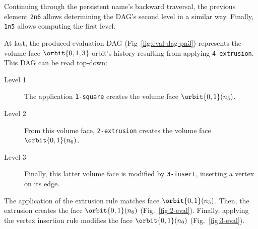 Continuing through the persistent name's backward traversal, the previous element \texttt{2n6} allows determining the DAG's second level %
in a similar way.
Finally, \texttt{1n5} allows computing the first level.   

At last, the produced evaluation DAG (Fig~\ref{fig:eval-dag-pn3}) represents the volume face $\orbit{0,1,3}$-orbit's history  resulting from applying \texttt{4-extrusion}.
This DAG can be read top-down:
\begin{description}
    \item[Level 1] The application \texttt{1-square} creates the volume face $\orbit{0,1}(n_5)$.
    \item[Level 2] From this volume face, \texttt{2-extrusion} creates the vo\-lu\-me face $\orbit{0,1}(n_6)$.
    \item[Level 3] Finally, this latter volume face is modified by \texttt{3-insert}, inserting a vertex on its edge.
\end{description}


The %
application of the extrusion rule
matches face $\orbit{0,1}(n_{5})$. Then, the ex\-tru\-sion creates the face $\orbit{0,1}(n_{6})$ (Fig.~\ref{fig:2-eval}).
Finally, %
applying the vertex insertion rule
modifies the face $\orbit{0,1}(n_{0})$ (Fig.~\ref{fig:3-eval}). %

